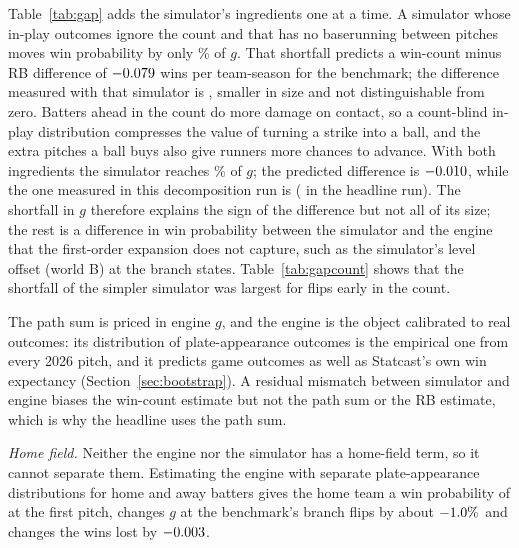\documentclass[aoas]{imsart}
\theoremstyle{plain}
\theoremstyle{definition}
\begin{document}
Table~\ref{tab:gap} adds the simulator's ingredients one at a time. A simulator whose in-play outcomes ignore the
count and that has no baserunning between pitches moves win probability by only \SimGShare\% of $g$. That shortfall
predicts a win-count minus RB difference of $-0.079$ wins per team-season for the benchmark; the difference measured with that simulator is \SGapMeasOld{} \SGapMeasOldCI, smaller in size and not distinguishable
from zero. Batters ahead in the count do more damage on contact, so a count-blind in-play distribution compresses the
value of turning a strike into a ball, and the extra pitches a ball buys also give runners more chances to advance.
With both ingredients the simulator reaches \SimGShareRun\% of $g$; the predicted difference is $-0.010$, while the
one measured in this decomposition run is \SGapMeasNew{} \SGapMeasNewCI{} (\BinaryMinusRB{} in the headline run). The
shortfall in $g$ therefore explains the sign of the difference but not all of its size; the rest is a difference in
win probability between the simulator and the engine that the first-order expansion does not capture, such as the
simulator's level offset (world B) at the branch states. Table~\ref{tab:gapcount} shows that the shortfall of the simpler
simulator was largest for flips early in the count.

The path sum is priced in engine $g$, and the engine is the object calibrated to real outcomes: its distribution of
plate-appearance outcomes is the empirical one from every 2026 pitch, and it predicts game outcomes as well as
Statcast's own win expectancy (Section~\ref{sec:bootstrap}). A residual mismatch between simulator and engine biases
the win-count estimate but not the path sum or the RB estimate, which is why the headline uses the path sum.

\emph{Home field.} Neither the engine nor the simulator has a home-field term, so it cannot separate them. Estimating
the engine with separate plate-appearance distributions for home and away batters gives the home team a win
probability of \SGapHomeWP{} at the first pitch, changes $g$ at the benchmark's branch flips by about $-1.0\%$
and changes the wins lost by $-0.003$.

\begin{table}[!htbp]
\caption{Simulator against WP engine at the benchmark's branch flips: the simulator's swing in win probability as a share
of the engine's $g$ (exact chain), and the win-count minus RB difference that the mismatch predicts, wins per
team-season. Each row adds one ingredient to the row above.}\label{tab:gap}
\centering\small
\resizebox{\textwidth}{!}{}
\end{table}
\end{document}
